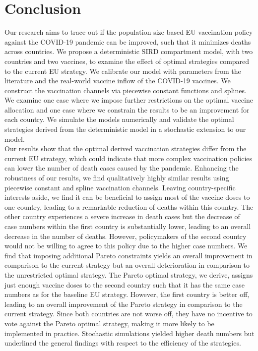 \section{Conclusion}
Our research aims to trace out if the population size based EU vaccination policy against the COVID-19 pandemic can be improved, such that it minimizes deaths across countries. We propose a deterministic SIRD compartment model, with two countries and two vaccines, to examine the effect of optimal strategies compared to the current EU strategy. We calibrate our model with parameters from the literature and the real-world vaccine inflow of the COVID-19 vaccines. We construct the vaccination channels via piecewise constant functions and splines. We examine one case where we impose further restrictions on the optimal vaccine allocation and one case where we constrain the results to be an improvement for each country. We simulate the models numerically and validate the optimal strategies derived from the deterministic model in a stochastic extension to our model.\\

Our results show that the optimal derived vaccination strategies differ from the current EU strategy, which could indicate that more complex vaccination policies can lower the number of death cases caused by the pandemic. Enhancing the robustness of our results, we find qualitatively highly similar results using piecewise constant and spline vaccination channels. Leaving country-specific interests aside, we find it can be beneficial to assign most of the vaccine doses to one country, leading to a remarkable reduction of deaths within this country. The other country experiences a severe increase in death cases but the decrease of case numbers within the first country is substantially lower, leading to an overall decrease in the number of deaths. However, policymakers of the second country would not be willing to agree to this policy due to the higher case numbers.  We find that imposing additional Pareto constraints yields an overall improvement in comparison to the current strategy but an overall deterioration in comparison to the unrestricted optimal strategy. The Pareto optimal strategy, we derive, assigns just enough vaccine doses to the second country such that it has the same case numbers as for the baseline EU strategy. However, the first country is better off, leading to an overall improvement of the Pareto strategy in comparison to the current strategy. Since both countries are not worse off, they have no incentive to vote against the Pareto optimal strategy, making it more likely to be implemented in practice. Stochastic simulations yielded higher death numbers but underlined the general findings with respect to the efficiency of the strategies.

